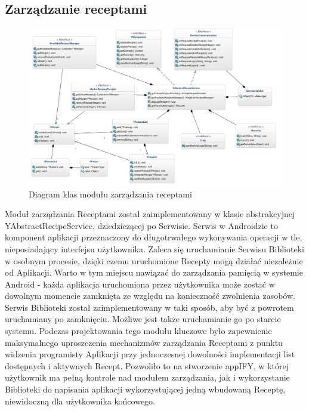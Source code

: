 \documentclass[11pt,a4paper,polish,thesis]{dcsbook}
\begin{document}
\subsection{Zarządzanie receptami}
\begin{figure}[H]
  \centering
  \hspace*{-0.9in}
  \includegraphics[scale=0.6]{./resources/service_uml.png}
  \caption{Diagram klas modułu zarządzania receptami}
  \label{fig:service_uml}
\end{figure}
Moduł zarządzania Receptami został zaimplementowany w klasie abstrakcyjnej YAbstractRecipeService, dziedziczącej po Serwisie.
Serwis w Androidzie to komponent aplikacji przeznaczony do długotrwałego wykonywania operacji w tle, nieposiadający interfejsu użytkownika. \cite{android.serwis}
Zaleca się uruchamianie Serwisu Biblioteki w osobnym procesie, dzięki czemu uruchomione Recepty mogą działać niezależnie od Aplikacji. Warto w tym miejscu nawiązać do zarządzania pamięcią w systemie Android - każda aplikacja uruchomiona przez użytkownika może zostać w dowolnym momencie zamknięta ze względu na konieczność zwolnienia zasobów. Serwis Biblioteki został zaimplementowany w taki sposób, aby być z powrotem uruchamiany po zamknięciu. Możliwe jest także uruchamianie go po starcie systemu.
Podczas projektowania tego modułu kluczowe było zapewnienie maksymalnego uproszczenia mechanizmów zarządzania Receptami z punktu widzenia programisty Aplikacji przy jednoczesnej dowolności implementacji list dostępnych i aktywnych Recept. Pozwoliło to na stworzenie appIFY, w której użytkownik ma pełną kontrole nad modułem zarządzania, jak i wykorzystanie Biblioteki do napisania aplikacji wykorzystującej jedną wbudowaną Receptę, niewidoczną dla użytkownika końcowego.
\end{document}

